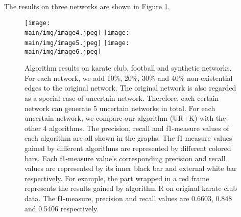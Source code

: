 \documentclass[\main/thesis.tex]{subfiles}
\begin{document}


The results on three networks are shown in Figure \ref{supervised-result-local}.

\begin{figure}
\texttt{[image: \\main/img/image4.jpeg]}
\centering
\texttt{[image: \\main/img/image5.jpeg]}
\centering
\texttt{[image: \\main/img/image6.jpeg]}
\caption{Algorithm results on karate club, football and synthetic networks. For each network, we add 10\%, 20\%, 30\% and 40\% non-existential edges to the original network. The original network is also regarded as a special case of uncertain network. Therefore, each certain network can generate 5 uncertain networks in total. For each uncertain network, we compare our algorithm (UR+K) with the other 4 algorithms. The precision, recall and f1-measure values of each algorithm are all shown in the graphs. The f1-measure values gained by different algorithms are represented by different colored bars. Each f1-measure value's corresponding precision and recall values are represented by its inner black bar and external white bar respectively. For example, the part wrapped in a red frame represents the results gained by algorithm R on original karate club data. The f1-measure, precision and recall values are 0.6603, 0.848 and 0.5406 respectively.}
\label{supervised-result-local}
\end{figure}

\end{document}
